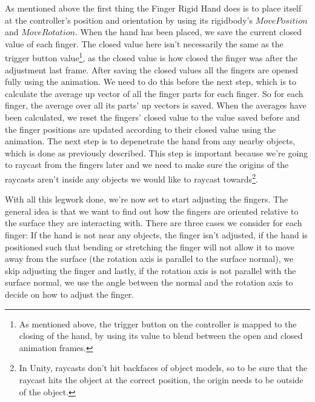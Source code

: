 As mentioned above the first thing the Finger Rigid Hand does is to place itself at the controller's position and orientation by using its rigidbody's $MovePosition$ and $MoveRotation$. When the hand has been placed, we save the current closed value of each finger. The closed value here isn't necessarily the same as the trigger button value\footnote{As mentioned above, the trigger button on the controller is mapped to the closing of the hand, by using its value to blend between the open and closed animation frames.}, as the closed value is how closed the finger was after the adjustment last frame. After saving the closed values all the fingers are opened fully using the animation. We need to do this before the next step, which is to calculate the average up vector of all the finger parts for each finger. So for each finger, the average over all its parts' up vectors is saved. When the averages have been calculated, we reset the fingers' closed value to the value saved before and the finger positions are updated according to their closed value using the animation. The next step is to depenetrate the hand from any nearby objects, which is done as previously described. This step is important because we're going to raycast from the fingers later and we need to make sure the origins of the raycasts aren't inside any objects we would like to raycast towards\footnote{In Unity, raycasts don't hit backfaces of object models, so to be sure that the raycast hits the object at the correct position, the origin needs to be outside of the object.}. 

With all this legwork done, we're now set to start adjusting the fingers. The general idea is that we want to find out how the fingers are oriented relative to the surface they are interacting with. There are three cases we consider for each finger: If the hand is not near any objects, the finger isn't adjusted, if the hand is positioned such that bending or stretching the finger will not allow it to move away from the surface (the rotation axis is parallel to the surface normal), we skip adjusting the finger and lastly, if the rotation axis is not parallel with the surface normal, we use the angle between the normal and the rotation axis to decide on how to adjust the finger.

